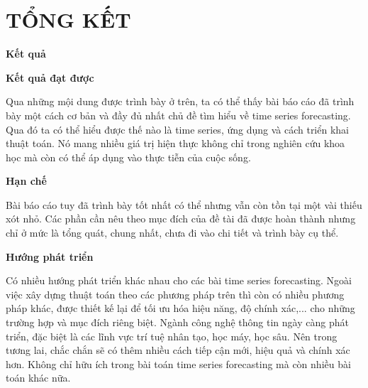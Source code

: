 \chapter{TỔNG KẾT}


%
\bigskip
\changefontsizes{15pt}

\setlength{\parindent}{0.0cm}
\textbf{\textbf{Kết quả}}

\changefontsizes{14pt}
\vspace{0.5cm}
\setlength{\parindent}{0cm}
\textbf{Kết quả đạt được}

\vspace{0.5cm}
\changefontsizes{13pt}


\setlength{\parindent}{0cm}
Qua những mội dung được trình bày ở trên, ta có thể thấy bài báo cáo đã trình bày một cách cơ bản và đầy đủ nhất chủ đề tìm hiểu về time series forecasting. Qua đó ta có thể hiểu được thế nào là time series, ứng dụng và cách triển khai thuật toán. Nó mang nhiều giá trị hiện thực không chỉ trong nghiên cứu khoa học mà còn có thể áp dụng vào thực tiễn của cuộc sống.


\vspace{0.5cm}
\changefontsizes{14pt}

\textbf{Hạn chế}


\vspace{0.5cm}
\changefontsizes{13pt}


Bài báo cáo tuy đã trình bày tốt nhất có thể nhưng vẫn còn tồn tại một vài thiếu xót nhỏ. Các phần cần nêu theo mục đích của đề tài đã được hoàn thành nhưng chỉ ở mức là tổng quát, chung nhất, chưa đi vào chi tiết và trình bày cụ thể.


\vspace{0.5cm}
\changefontsizes{15pt}

\setlength{\parindent}{0.0cm}
\textbf{Hướng phát triển}



\changefontsizes{13pt}
\vspace{0.5cm}


Có nhiều hướng phát triển khác nhau cho các bài time series forecasting. Ngoài việc xây dựng thuật toán theo các phương pháp trên thì còn có nhiều phương pháp khác, được thiết kế lại để tối ưu hóa hiệu năng, độ chính xác,... cho những trường hợp và mục đích riêng biệt. Ngành công nghệ thông tin ngày càng phát triển, đặc biệt là các lĩnh vực trí tuệ nhân tạo, học máy, học sâu. Nên trong tương lai, chắc chắn sẽ có thêm nhiều cách tiếp cận mới, hiệu quả và chính xác hơn. Không chỉ hữu ích trong bài toán time series forecasting mà còn nhiều bài toán khác nữa.

